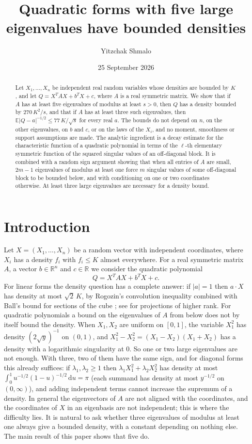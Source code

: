 \documentclass[11pt]{amsart}
\title{Quadratic forms with five large eigenvalues have bounded densities}
\author{Yitzchak Shmalo}
\date{25 September 2026}
\numberwithin{equation}{section}
\theoremstyle{definition}
\theoremstyle{remark}
\newcommand{\R}{\mathbb R}
\newcommand{\E}{\mathbb E}
\newcommand{\1}{\mathbf 1}
\newcommand{\dd}{\,\mathrm d}
\newcommand{\abs}[1]{\lvert #1\rvert}
\begin{document}
\begin{abstract}
Let $X_1,\dots,X_n$ be independent real random variables whose densities are bounded by $K$, and let $Q=X^{T}AX+b^{T}X+c$, where $A$ is a real symmetric matrix. We show that if $A$ has at least five eigenvalues of modulus at least $s>0$, then $Q$ has a density bounded by $270\,K^2/s$, and that if $A$ has at least three such eigenvalues, then $\E\abs{Q-a}^{-1/2}\le77\,K/\sqrt s$ for every real $a$. The bounds do not depend on $n$, on the other eigenvalues, on $b$ and $c$, or on the laws of the $X_i$, and no moment, smoothness or support assumptions are made. The analytic ingredient is a decay estimate for the characteristic function of a quadratic polynomial in terms of the $\ell$-th elementary symmetric function of the squared singular values of an off-diagonal block. It is combined with a random sign argument showing that when all entries of $A$ are small, $2m-1$ eigenvalues of modulus at least one force $m$ singular values of some off-diagonal block to be bounded below, and with conditioning on one or two coordinates otherwise. At least three large eigenvalues are necessary for a density bound.
\end{abstract}

\maketitle

\section{Introduction}\label{sec:intro}

Let $X=(X_1,\dots,X_n)$ be a random vector with independent coordinates, where $X_i$ has a density $f_i$ with $f_i\le K$ almost everywhere. For a real symmetric matrix $A$, a vector $b\in\R^n$ and $c\in\R$ we consider the quadratic polynomial
\[
Q=X^{T}AX+b^{T}X+c .
\]
For linear forms the density question has a complete answer: if $\abs{a}=1$ then $a\cdot X$ has density at most $\sqrt2\,K$, by Rogozin's convolution inequality \cite{Rogozin} combined with Ball's bound for sections of the cube \cite{Ball}; see \cite{RV,LPP} for projections of higher rank. For quadratic polynomials a bound on the eigenvalues of $A$ from below does not by itself bound the density. When $X_1,X_2$ are uniform on $[0,1]$, the variable $X_1^2$ has density $(2\sqrt y)^{-1}$ on $(0,1)$, and $X_1^2-X_2^2=(X_1-X_2)(X_1+X_2)$ has a density with a logarithmic singularity at $0$. So one or two large eigenvalues are not enough. With three, two of them have the same sign, and for diagonal forms this already suffices: if $\lambda_1,\lambda_2\ge1$ then $\lambda_1X_1^2+\lambda_2X_2^2$ has density at most $\int_0^1u^{-1/2}(1-u)^{-1/2}\dd u=\pi$ (each summand has density at most $y^{-1/2}$ on $(0,\infty)$), and adding independent terms cannot increase the supremum of a density. In general the eigenvectors of $A$ are not aligned with the coordinates, and the coordinates of $X$ in an eigenbasis are not independent; this is where the difficulty lies. It is natural to ask whether three eigenvalues of modulus at least one always give a bounded density, with a constant depending on nothing else. The main result of this paper shows that five do.
\end{document}
